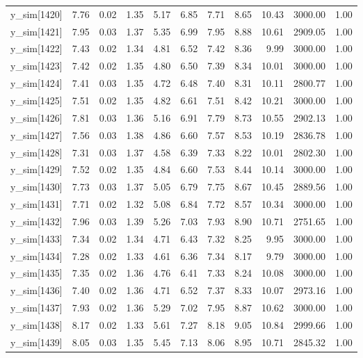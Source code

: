 \begin{table}[ht]
\begin{tabular}{rrrrrrrrrrr}
  y\_sim[1420] & 7.76 & 0.02 & 1.35 & 5.17 & 6.85 & 7.71 & 8.65 & 10.43 & 3000.00 & 1.00 \\ 
  y\_sim[1421] & 7.95 & 0.03 & 1.37 & 5.35 & 6.99 & 7.95 & 8.88 & 10.61 & 2909.05 & 1.00 \\ 
  y\_sim[1422] & 7.43 & 0.02 & 1.34 & 4.81 & 6.52 & 7.42 & 8.36 & 9.99 & 3000.00 & 1.00 \\ 
  y\_sim[1423] & 7.42 & 0.02 & 1.35 & 4.80 & 6.50 & 7.39 & 8.34 & 10.01 & 3000.00 & 1.00 \\ 
  y\_sim[1424] & 7.41 & 0.03 & 1.35 & 4.72 & 6.48 & 7.40 & 8.31 & 10.11 & 2800.77 & 1.00 \\ 
  y\_sim[1425] & 7.51 & 0.02 & 1.35 & 4.82 & 6.61 & 7.51 & 8.42 & 10.21 & 3000.00 & 1.00 \\ 
  y\_sim[1426] & 7.81 & 0.03 & 1.36 & 5.16 & 6.91 & 7.79 & 8.73 & 10.55 & 2902.13 & 1.00 \\ 
  y\_sim[1427] & 7.56 & 0.03 & 1.38 & 4.86 & 6.60 & 7.57 & 8.53 & 10.19 & 2836.78 & 1.00 \\ 
  y\_sim[1428] & 7.31 & 0.03 & 1.37 & 4.58 & 6.39 & 7.33 & 8.22 & 10.01 & 2802.30 & 1.00 \\ 
  y\_sim[1429] & 7.52 & 0.02 & 1.35 & 4.84 & 6.60 & 7.53 & 8.44 & 10.14 & 3000.00 & 1.00 \\ 
  y\_sim[1430] & 7.73 & 0.03 & 1.37 & 5.05 & 6.79 & 7.75 & 8.67 & 10.45 & 2889.56 & 1.00 \\ 
  y\_sim[1431] & 7.71 & 0.02 & 1.32 & 5.08 & 6.84 & 7.72 & 8.57 & 10.34 & 3000.00 & 1.00 \\ 
  y\_sim[1432] & 7.96 & 0.03 & 1.39 & 5.26 & 7.03 & 7.93 & 8.90 & 10.71 & 2751.65 & 1.00 \\ 
  y\_sim[1433] & 7.34 & 0.02 & 1.34 & 4.71 & 6.43 & 7.32 & 8.25 & 9.95 & 3000.00 & 1.00 \\ 
  y\_sim[1434] & 7.28 & 0.02 & 1.33 & 4.61 & 6.36 & 7.34 & 8.17 & 9.79 & 3000.00 & 1.00 \\ 
  y\_sim[1435] & 7.35 & 0.02 & 1.36 & 4.76 & 6.41 & 7.33 & 8.24 & 10.08 & 3000.00 & 1.00 \\ 
  y\_sim[1436] & 7.40 & 0.02 & 1.36 & 4.71 & 6.52 & 7.37 & 8.33 & 10.07 & 2973.16 & 1.00 \\ 
  y\_sim[1437] & 7.93 & 0.02 & 1.36 & 5.29 & 7.02 & 7.95 & 8.87 & 10.62 & 3000.00 & 1.00 \\ 
  y\_sim[1438] & 8.17 & 0.02 & 1.33 & 5.61 & 7.27 & 8.18 & 9.05 & 10.84 & 2999.66 & 1.00 \\ 
  y\_sim[1439] & 8.05 & 0.03 & 1.35 & 5.45 & 7.13 & 8.06 & 8.95 & 10.71 & 2845.32 & 1.00 \\ 

\end{tabular}
\end{table}
